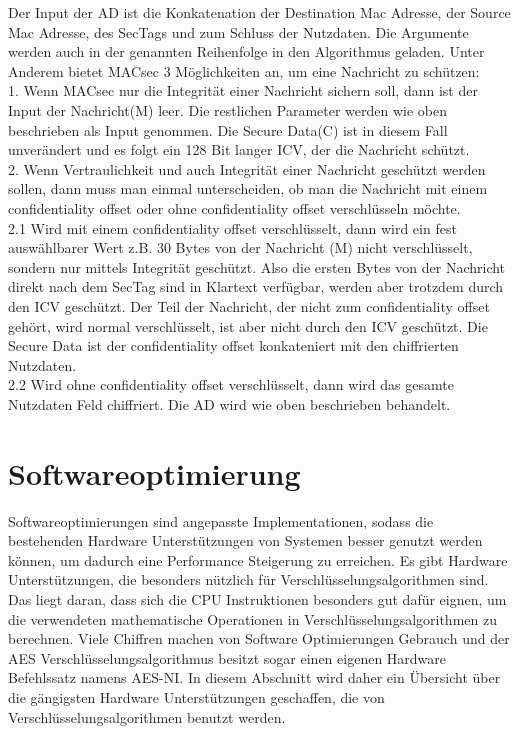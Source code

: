 Der Input der \gls{AD} ist die Konkatenation der Destination Mac Adresse, der Source Mac Adresse, des SecTags und zum Schluss der Nutzdaten. Die Argumente werden auch in der genannten Reihenfolge in den Algorithmus geladen.
Unter Anderem bietet MACsec 3 Möglichkeiten an, um eine Nachricht zu schützen:\\
1. Wenn MACsec nur die Integrität einer Nachricht sichern soll, dann ist der Input der Nachricht(M) leer. Die restlichen Parameter werden wie oben beschrieben als Input genommen. Die Secure Data(C) ist in diesem Fall unverändert und es folgt ein 128 Bit langer \gls{ICV}, der die Nachricht schützt.\\
2. Wenn Vertraulichkeit und auch Integrität einer Nachricht geschützt werden sollen, dann muss man einmal unterscheiden, ob man die Nachricht mit einem confidentiality offset oder ohne confidentiality offset verschlüsseln möchte.\\
2.1 Wird mit einem confidentiality offset verschlüsselt, dann wird ein fest auswählbarer Wert z.B. 30 Bytes von der Nachricht (M) nicht verschlüsselt, sondern nur mittels Integrität geschützt. Also die ersten Bytes von der Nachricht direkt nach dem SecTag sind in Klartext verfügbar, werden aber trotzdem durch den \gls{ICV} geschützt. Der Teil der Nachricht, der nicht zum confidentiality offset gehört, wird normal verschlüsselt, ist aber nicht durch den ICV geschützt. Die Secure Data ist der confidentiality offset konkateniert mit den chiffrierten Nutzdaten. \\
2.2 Wird ohne confidentiality offset verschlüsselt, dann wird das gesamte Nutzdaten Feld chiffriert. Die \gls{AD} wird wie oben beschrieben behandelt.
\section{Softwareoptimierung}
Softwareoptimierungen sind angepasste Implementationen, sodass die bestehenden Hardware Unterstützungen von Systemen besser genutzt werden können, um dadurch eine Performance Steigerung zu erreichen. Es gibt Hardware Unterstützungen, die besonders nützlich für Verschlüsselungsalgorithmen sind. Das liegt daran, dass sich die CPU Instruktionen besonders gut dafür eignen, um die verwendeten mathematische Operationen in Verschlüsselungsalgorithmen zu berechnen. Viele Chiffren machen von Software Optimierungen Gebrauch und der AES Verschlüsselungsalgorithmus besitzt sogar einen eigenen Hardware Befehlssatz namens \gls{AES-NI}. In diesem Abschnitt wird daher ein Übersicht über die gängigsten Hardware Unterstützungen geschaffen, die von Verschlüsselungsalgorithmen benutzt werden.
